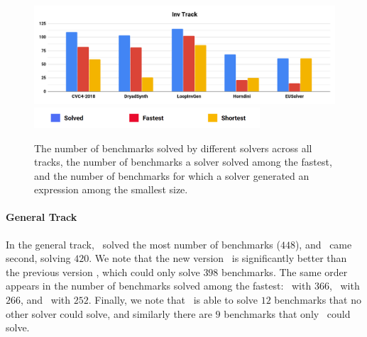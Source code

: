 \begin{figure}
\begin{center}
		\begin{minipage}{\textwidth}
			\centering%
			\includegraphics[width=\textwidth]{figures/TrackInv.png}\\[0.5em]
			\includegraphics[width=0.75\textwidth]{figures/Legend.png}
		\end{minipage}
	\end{center}
	\caption{The number of benchmarks solved by different solvers across all tracks,
			 the number of benchmarks a solver solved among the fastest,
			 and the number of benchmarks for which a solver generated an expression among the smallest size.}
	\label{fig:resultsPerTrack}	
\end{figure}

\paragraph{General Track}
In the general track, \cvcnew\ solved the most number of benchmarks ($448$),
and \eusolvernew\ came second, solving $420$.
We note that the new version \cvcnew\ is significantly better than the previous version \cvclast,
which could only solve $398$ benchmarks.
The same order appears in the number of benchmarks solved among the fastest:
\cvcnew\ with $366$, \eusolvernew\ with $266$, and \cvclast\ with $252$.
Finally, we note that \cvcnew\ is able to solve $12$ benchmarks that no other solver could solve,
and similarly there are $9$ benchmarks that only \eusolver\ could solve.

